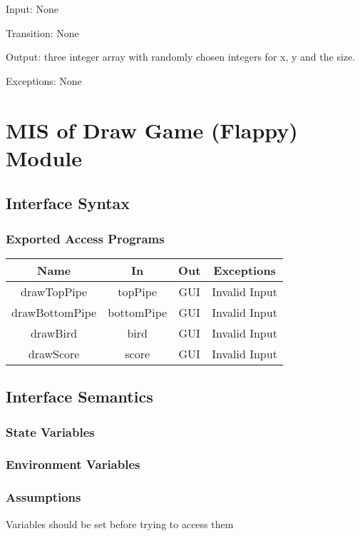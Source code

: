 \documentclass[12pt, titlepage]{article}
\begin{document}
		Input: None
		
		Transition: None
		
		Output: three integer array with randomly chosen integers for x, y and the size.
		
		Exceptions: None\\
		
		
\section{MIS of Draw Game (Flappy) Module}
		\subsection{Interface Syntax}
		\subsubsection{Exported Access Programs}
		\begin{tabular}[pos]{|c|c|c|c|}
			\hline
			\textbf{Name}& \textbf{In} & \textbf{Out} & \textbf{Exceptions} \\ \hline
			drawTopPipe & topPipe & GUI & Invalid Input \\ \hline
			drawBottomPipe & bottomPipe & GUI & Invalid Input \\ \hline
			drawBird & bird & GUI & Invalid Input \\ \hline
			drawScore & score & GUI & Invalid Input \\ \hline
			
		\end{tabular}
		
		\subsection{Interface Semantics}
		\subsubsection{State Variables}
		
		\subsubsection{Environment Variables}
		
		
		\subsubsection{Assumptions}
		Variables should be set before trying to access them \\ 
		
\end{document}
